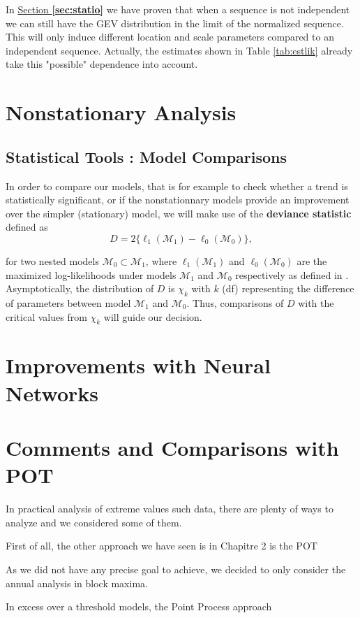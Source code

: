 In \hyperref[sec:statio]{Section \textbf{\ref{sec:statio}}} we have proven that when a sequence is not independent we can still have the GEV
distribution in the limit of the normalized sequence. This will only induce different location and scale
parameters compared to an independent sequence. Actually, the estimates shown in Table \ref{tab:estlik} already take this "possible" dependence into account.


\section{Nonstationary Analysis}


\subsection{Statistical Tools : Model Comparisons}

In order to compare our models, that is for example to check whether a trend is statistically significant, or if the nonstationnary models provide an improvement over the simpler (stationary) model, we will make use of the \textbf{deviance statistic} defined as 
\begin{equation}
D = 2\big\{\ell_1(\mathcal{M}_1)-\ell_0(\mathcal{M}_0)\big\},
\end{equation}

for two nested models $\mathcal{M}_0\subset \mathcal{M}_1$, where $\ell_1(\mathcal{M}_1)$ and $\ell_0(\mathcal{M}_0)$ are the maximized log-likelihoods under models $\mathcal{M}_1$ and $\mathcal{M}_0$ respectively as defined in .
Asymptotically, the distribution of $D$ is $\chi_k$ with $k$ (df) representing the difference of parameters between model $\mathcal{M}_1$ and $\mathcal{M}_0$. Thus, comparisons of $D$ with the critical values from $\chi_k$ will guide our decision.



\section{Improvements with Neural Networks}



\section{Comments and Comparisons with POT}

In practical analysis of extreme values such data, there are plenty of ways to analyze and we considered
some of them.

First of all, the other approach we have seen is in Chapitre 2 is the POT

As we did not have any precise goal to achieve, we decided to only consider the annual analysis in
block maxima.

In excess over a threshold models, the Point Process approach